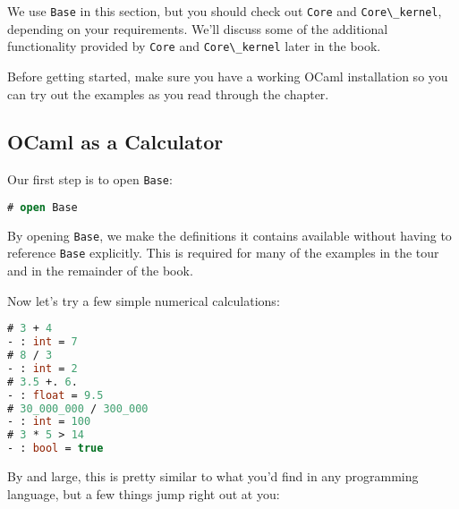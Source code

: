 We use \passthrough{\lstinline!Base!} in this section, but you should
check out \passthrough{\lstinline!Core!} and
\passthrough{\lstinline!Core\_kernel!}, depending on your requirements.
We'll discuss some of the additional functionality provided by
\passthrough{\lstinline!Core!} and
\passthrough{\lstinline!Core\_kernel!} later in the book.

Before getting started, make sure you have a working OCaml installation
so you can try out the examples as you read through the chapter.

\hypertarget{ocaml-as-a-calculator}{%
\subsection{OCaml as a Calculator}\label{ocaml-as-a-calculator}}

Our first step is to open \passthrough{\lstinline!Base!}:

\begin{lstlisting}[language=Caml]
# open Base
\end{lstlisting}

By opening \passthrough{\lstinline!Base!}, we make the definitions it
contains available without having to reference
\passthrough{\lstinline!Base!} explicitly. This is required for many of
the examples in the tour and in the remainder of the book.

Now let's try a few simple numerical calculations:

\begin{lstlisting}[language=Caml]
# 3 + 4
- : int = 7
# 8 / 3
- : int = 2
# 3.5 +. 6.
- : float = 9.5
# 30_000_000 / 300_000
- : int = 100
# 3 * 5 > 14
- : bool = true
\end{lstlisting}

By and large, this is pretty similar to what you'd find in any
programming language, but a few things jump right out at you:

